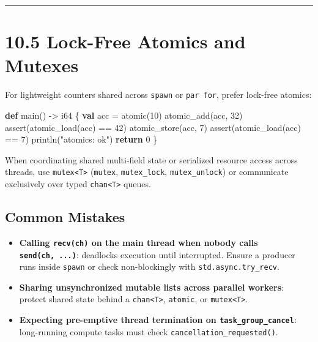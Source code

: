 \documentclass[
  english,
  oneside]{book}
\newenvironment{Shaded}{\begin{snugshade}}{\end{snugshade}}
\newcommand{\ControlFlowTok}[1]{\textcolor[rgb]{0.77,0.53,0.75}{\textbf{#1}}}
\newcommand{\DataTypeTok}[1]{\textcolor[rgb]{0.31,0.79,0.69}{#1}}
\newcommand{\DecValTok}[1]{\textcolor[rgb]{0.71,0.81,0.66}{#1}}
\newcommand{\FunctionTok}[1]{\textcolor[rgb]{0.86,0.86,0.67}{#1}}
\newcommand{\KeywordTok}[1]{\textcolor[rgb]{0.34,0.61,0.84}{\textbf{#1}}}
\newcommand{\NormalTok}[1]{\textcolor[rgb]{0.83,0.83,0.83}{#1}}
\newcommand{\OperatorTok}[1]{\textcolor[rgb]{0.83,0.83,0.83}{#1}}
\newcommand{\StringTok}[1]{\textcolor[rgb]{0.81,0.57,0.47}{#1}}
\providecommand{\tightlist}{%
  \setlength{\itemsep}{0pt}\setlength{\parskip}{0pt}}
\begin{document}
\begin{center}\rule{0.5\linewidth}{0.5pt}\end{center}

\section{10.5 Lock-Free Atomics and
Mutexes}\label{lock-free-atomics-and-mutexes}

For lightweight counters shared across \texttt{spawn} or
\texttt{par\ for}, prefer lock-free atomics:

\begin{Shaded}
\begin{Highlighting}[]
\KeywordTok{def}\NormalTok{ main() }\OperatorTok{{-}\textgreater{}} \DataTypeTok{i64}\NormalTok{ \{}
    \KeywordTok{val}\NormalTok{ acc }\OperatorTok{=} \DataTypeTok{atomic}\NormalTok{(}\DecValTok{10}\NormalTok{)}
    \FunctionTok{atomic\_add}\NormalTok{(acc, }\DecValTok{32}\NormalTok{)}
    \FunctionTok{assert}\NormalTok{(}\FunctionTok{atomic\_load}\NormalTok{(acc) }\OperatorTok{==} \DecValTok{42}\NormalTok{)}
    \FunctionTok{atomic\_store}\NormalTok{(acc, }\DecValTok{7}\NormalTok{)}
    \FunctionTok{assert}\NormalTok{(}\FunctionTok{atomic\_load}\NormalTok{(acc) }\OperatorTok{==} \DecValTok{7}\NormalTok{)}
\NormalTok{    println(}\StringTok{"atomics: ok"}\NormalTok{)}
    \ControlFlowTok{return} \DecValTok{0}
\NormalTok{\}}
\end{Highlighting}
\end{Shaded}

When coordinating shared multi-field state or serialized resource access
across threads, use \texttt{mutex\textless{}T\textgreater{}}
(\texttt{mutex}, \texttt{mutex\_lock}, \texttt{mutex\_unlock}) or
communicate exclusively over typed
\texttt{chan\textless{}T\textgreater{}} queues.

\subsection{Common Mistakes}\label{common-mistakes-9}

\begin{itemize}
\tightlist
\item
  \textbf{Calling \texttt{recv(ch)} on the main thread when nobody calls
  \texttt{send(ch,\ ...)}}: deadlocks execution until interrupted.
  Ensure a producer runs inside \texttt{spawn} or check non-blockingly
  with \texttt{std.async.try\_recv}.
\item
  \textbf{Sharing unsynchronized mutable lists across parallel workers}:
  protect shared state behind a \texttt{chan\textless{}T\textgreater{}},
  \texttt{atomic}, or \texttt{mutex\textless{}T\textgreater{}}.
\item
  \textbf{Expecting pre-emptive thread termination on
  \texttt{task\_group\_cancel}}: long-running compute tasks must check
  \texttt{cancellation\_requested()}.
\end{itemize}
\end{document}

